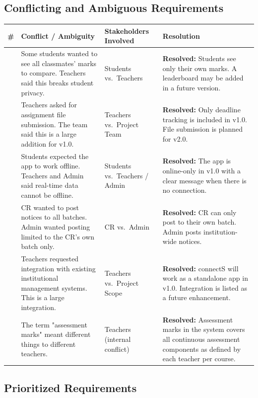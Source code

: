 \documentclass[12pt,a4paper]{article}
\newcommand{\THH}[1]{\small\bfseries\color{white} #1}
\begin{document}
\subsection{Conflicting and Ambiguous Requirements}

\vspace{0.4em}
\begin{longtable}{|>{\centering\arraybackslash}p{0.7cm}|p{3.5cm}|p{3.5cm}|p{5.5cm}|}
\hline
\rowcolor{navyblue}
\THH{\#} & \THH{Conflict / Ambiguity} & \THH{Stakeholders Involved} & \THH{Resolution} \\
\hline
\endhead
1 &
Some students wanted to see all classmates' marks to compare. Teachers said this breaks student privacy. &
Students vs.\ Teachers &
\textbf{Resolved:} Students see only their own marks. A leaderboard may be added in a future version. \\
\hline
2 &
Teachers asked for assignment file submission. The team said this is a large addition for v1.0. &
Teachers vs.\ Project Team &
\textbf{Resolved:} Only deadline tracking is included in v1.0. File submission is planned for v2.0. \\
\hline
3 &
Students expected the app to work offline. Teachers and Admin said real-time data cannot be offline. &
Students vs.\ Teachers / Admin &
\textbf{Resolved:} The app is online-only in v1.0 with a clear message when there is no connection. \\
\hline
4 &
CR wanted to post notices to all batches. Admin wanted posting limited to the CR's own batch only. &
CR vs.\ Admin &
\textbf{Resolved:} CR can only post to their own batch. Admin posts institution-wide notices. \\
\hline
5 &
Teachers requested integration with existing institutional management systems. This is a large integration. &
Teachers vs.\ Project Scope &
\textbf{Resolved:} connectS will work as a standalone app in v1.0. Integration is listed as a future enhancement. \\
\hline
6 &
The term "assessment marks" meant different things to different teachers. &
Teachers (internal conflict) &
\textbf{Resolved:} Assessment marks in the system covers all continuous assessment components as defined by each teacher per course. \\
\hline
\end{longtable}
\newpage
\subsection{Prioritized Requirements}
\end{document}
